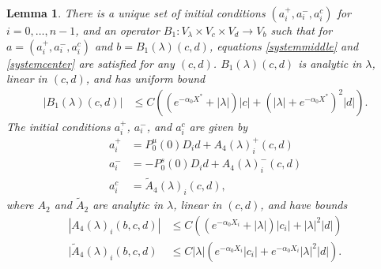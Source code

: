 \documentclass[12pt]{elsarticle}
\theoremstyle{plain}
\newtheorem{lemma}[theorem]{Lemma}
\theoremstyle{definition}
\theoremstyle{remark}
\numberwithin{theorem}{section}
\numberwithin{equation}{section}
\begin{document}
\begin{lemma}\label{Zinv2}
There is a unique set of initial conditions $(a_i^+, a_i^-, a_i^c)$ for $i = 0, \dots, n-1$, and an operator $B_1: V_\lambda \times V_c \times V_d \rightarrow V_b$ such that for $a = (a_i^+, a_i^-, a_i^c)$ and $b = B_1(\lambda)(c,d)$, equations \cref{systemmiddle} and \cref{systemcenter} are satisfied for any $(c, d)$. $B_1(\lambda)(c, d)$ is analytic in $\lambda$, linear in $(c, d)$, and has uniform bound
\begin{align}
|B_1(\lambda)(c, d)| &\leq C\left( (e^{-\alpha_0 X^*} + |\lambda|)|c| + (|\lambda| + e^{-\alpha_0 X^*})^2 |d| \right). \label{B1bound}
\end{align} 
The initial conditions $a_i^+$, $a_i^-$, and $a_i^c$ are given by
\begin{align*}
a_i^+ &= P_0^u(0) D_i d + A_4(\lambda)_i^+(c, d) \\
a_i^- &= -P_0^s(0) D_i d + A_4(\lambda)_i^-(c, d) \\
a_i^c &= \tilde{A}_4(\lambda)_i(c, d),
\end{align*}
where $A_2$ and $\tilde{A}_2$ are analytic in $\lambda$, linear in $(c, d)$, and have bounds
\begin{align}
|A_4(\lambda)_i(b, c, d)|
&\leq C \left( (e^{-\alpha_0 X_i} + |\lambda|)|c_i| + |\lambda|^2|d| \right) \label{A4bound} \\
|\tilde{A}_4(\lambda)_i(b, c, d) &\leq C |\lambda| \left( e^{-\alpha_0 X_i} |c_i| + e^{-\alpha_0 X_i} |\lambda|^2 |d| \right). \label{tildeA4bound}
\end{align}


\end{lemma}
\end{document}
